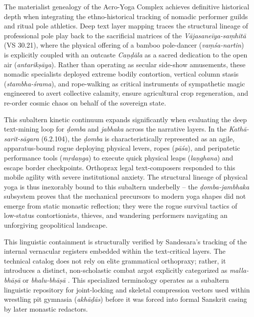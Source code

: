 \documentclass[11pt,twoside,letterpaper]{article}
\begin{document}
The materialist genealogy of the Acro-Yoga Complex achieves definitive historical depth when integrating the ethno-historical tracking of nomadic performer guilds and ritual pole athletics. Deep text layer mapping traces the structural lineage of professional pole play back to the sacrificial matrices of the \textit{V\={a}jasane\={i}ya-sa\d{m}hit\={a}} (VS 30.21), where the physical offering of a bamboo pole-dancer (\textit{va\d{m}\'sa-nartin}) is explicitly coupled with an outcaste \textit{Ca\d{n}\d{d}\={a}la} as a sacred dedication to the open air (\textit{antarik\d{s}\={a}ya}). Rather than operating as secular side-show amusements, these nomadic specialists deployed extreme bodily contortion, vertical column stasis (\textit{stambha-\'srama}), and rope-walking as critical instruments of sympathetic magic engineered to avert collective calamity, ensure agricultural crop regeneration, and re-order cosmic chaos on behalf of the sovereign state.

This subaltern kinetic continuum expands significantly when evaluating the deep text-mining loop for \textit{\d{d}omba} and \textit{jabhaka} across the narrative layers. In the \textit{Kath\={a}-sarit-s\={a}gara} (6.2.104), the \textit{\d{d}omba} is characteristically represented as an agile, apparatus-bound rogue deploying physical levers, ropes (\textit{p\={a}\'sa}), and peripatetic performance tools (\textit{m\d{r}da\d{n}ga}) to execute quick physical leaps (\textit{la\d{n}ghana}) and escape border checkpoints. Orthoprax legal text-composers responded to this mobile agility with severe institutional anxiety. The structural lineage of physical yoga is thus inexorably bound to this subaltern underbelly -- the \textit{\d{d}omba-jambhaka} subsystem proves that the mechanical precursors to modern yoga shapes did not emerge from static monastic reflection; they were the rogue survival tactics of low-status contortionists, thieves, and wandering performers navigating an unforgiving geopolitical landscape.

This linguistic containment is structurally verified by Sandesara’s tracking of the internal vernacular registers embedded within the text-critical layers. The technical catalog does not rely on elite grammatical orthopraxy; rather, it introduces a distinct, non-scholastic combat argot explicitly categorized as \textit{malla-bh\={a}\d{s}\={a}} or \textit{bhalu-bh\={a}\d{s}\={a}} \citep{Sandesara1948}. This specialized terminology operates as a subaltern linguistic repository for joint-locking and skeletal compression vectors used within wrestling pit gymnasia (\textit{akh\={a}\d{d}\={a}s}) before it was forced into formal Sanskrit casing by later monastic redactors.
\end{document}
